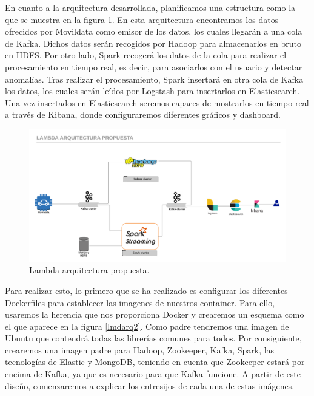 En cuanto a la arquitectura desarrollada, planificamos una estructura como la que se muestra en la figura \ref{lmdarq1}. En esta arquitectura encontramos los datos ofrecidos por Movildata como emisor de los datos, los cuales llegarán a una cola de Kafka. Dichos datos serán recogidos por Hadoop para almacenarlos en bruto en HDFS. Por otro lado, Spark recogerá los datos de la cola para realizar el procesamiento en tiempo real, es decir, para asociarlos con el usuario y detectar anomalías. Tras realizar el procesamiento, Spark insertará en otra cola de Kafka los datos, los cuales serán leídos por Logstash para insertarlos en Elasticsearch. Una vez insertados en Elasticsearch seremos capaces de mostrarlos en tiempo real a través de Kibana, donde configuraremos diferentes gráficos y dashboard.\par

\begin{figure}[htp]
\centering
\includegraphics[scale=0.26]{Imagenes/arqProp1.png}
\caption{Lambda arquitectura propuesta.}
\label{lmdarq1}
\end{figure}

Para realizar esto, lo primero que se ha realizado es configurar los diferentes Dockerfiles para establecer las imagenes de nuestros container. Para ello, usaremos la herencia que nos proporciona Docker y crearemos un esquema como el que aparece en la figura \ref{lmdarq2}. Como padre tendremos una imagen de Ubuntu que contendrá todas las librerías comunes para todos. Por consiguiente, crearemos una imagen padre para Hadoop, Zookeeper, Kafka, Spark, las tecnologías de Elastic y MongoDB, teniendo en cuenta que Zookeeper estará por encima de Kafka, ya que es necesario para que Kafka funcione. A partir de este diseño, comenzaremos a explicar los entresijos de cada una de estas imágenes.

